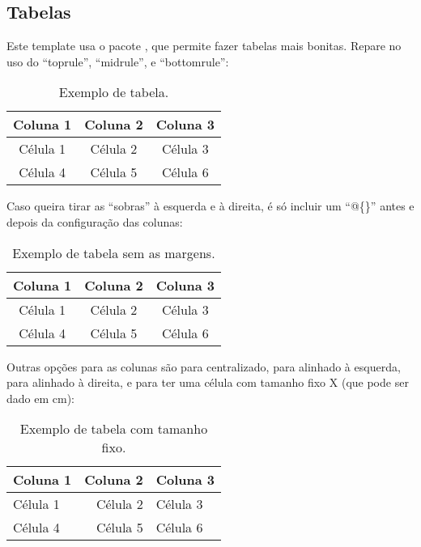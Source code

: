     \subsection{Tabelas}
      Este template usa o pacote , que permite fazer tabelas mais bonitas. Repare no uso do ``toprule'', ``midrule'', e ``bottomrule'':
      \begin{table}[h!]
        \centering
        \caption{Exemplo de tabela.}
        \label{tab:ex_1}
        \begin{tabular}{ccc}
          \toprule
          \textbf{Coluna 1} & \textbf{Coluna 2} & \textbf{Coluna 3} \\ \midrule
          Célula 1          & Célula 2          & Célula 3          \\ 
          Célula 4          & Célula 5          & Célula 6          \\ 
          \bottomrule
        \end{tabular}
      \end{table}

      Caso queira tirar as ``sobras'' à esquerda e à direita, é só incluir um ``@\{\}'' antes e depois da configuração das colunas:
      \begin{table}[h!]
        \centering
        \caption{Exemplo de tabela sem as margens.}
        \label{tab:ex_2}
        \begin{tabular}{@{}ccc@{}}
          \toprule
          \textbf{Coluna 1} & \textbf{Coluna 2} & \textbf{Coluna 3} \\ \midrule
          Célula 1          & Célula 2          & Célula 3          \\ 
          Célula 4          & Célula 5          & Célula 6          \\ 
          \bottomrule
        \end{tabular}
      \end{table}

      Outras opções para as colunas são  para centralizado,  para alinhado à esquerda,  para alinhado à direita, e  para ter uma célula com tamanho fixo X (que pode ser dado em cm):
      \begin{table}[h!]
        \centering
        \caption{Exemplo de tabela com tamanho fixo.}
        \label{tab:ex_3}
        \begin{tabular}{@{}lrp{5cm}@{}}
          \toprule
          \textbf{Coluna 1} & \textbf{Coluna 2} & \textbf{Coluna 3} \\ \midrule
          Célula 1          & Célula 2          & Célula 3          \\ 
          Célula 4          & Célula 5          & Célula 6          \\ 
          \bottomrule
        \end{tabular}
      \end{table}

